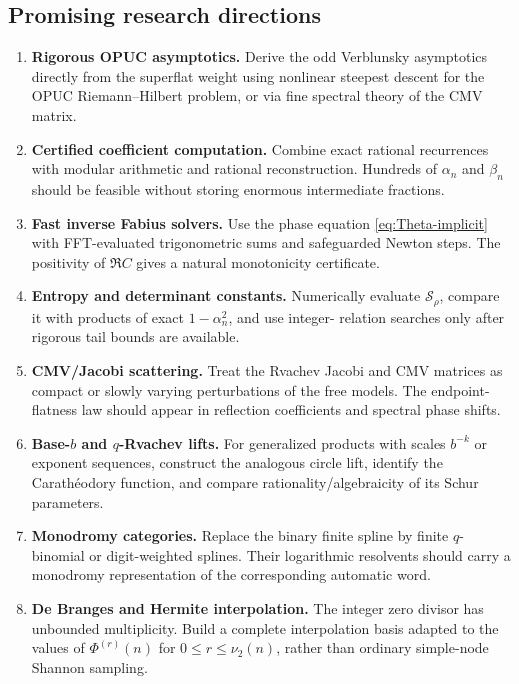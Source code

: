 \documentclass[11pt,oneside]{article}
\theoremstyle{definition}
\newcommand{\vTwo}{\nu_2}
\begin{document}
\subsection{Promising research directions}

\begin{enumerate}
\item \textbf{Rigorous OPUC asymptotics.} Derive the odd Verblunsky asymptotics directly from
the superflat weight using nonlinear steepest descent for the OPUC Riemann--Hilbert problem,
or via fine spectral theory of the CMV matrix.

\item \textbf{Certified coefficient computation.} Combine exact rational recurrences with
modular arithmetic and rational reconstruction. Hundreds of \(\alpha_n\) and \(\beta_n\)
should be feasible without storing enormous intermediate fractions.

\item \textbf{Fast inverse Fabius solvers.} Use the phase equation
\eqref{eq:Theta-implicit} with FFT-evaluated trigonometric sums and safeguarded Newton steps.
The positivity of \(\Re C\) gives a natural monotonicity certificate.

\item \textbf{Entropy and determinant constants.} Numerically evaluate
\(\mathcal S_\rho\), compare it with products of exact \(1-\alpha_n^2\), and use integer-
relation searches only after rigorous tail bounds are available.

\item \textbf{CMV/Jacobi scattering.} Treat the Rvachev Jacobi and CMV matrices as compact or
slowly varying perturbations of the free models. The endpoint-flatness law should appear in
reflection coefficients and spectral phase shifts.

\item \textbf{Base-\(b\) and \(q\)-Rvachev lifts.} For generalized products with scales
\(b^{-k}\) or exponent sequences, construct the analogous circle lift, identify the
Carath\'eodory function, and compare rationality/algebraicity of its Schur parameters.

\item \textbf{Monodromy categories.} Replace the binary finite spline by finite
\(q\)-binomial or digit-weighted splines. Their logarithmic resolvents should carry a
monodromy representation of the corresponding automatic word.

\item \textbf{De Branges and Hermite interpolation.} The integer zero divisor has unbounded
multiplicity. Build a complete interpolation basis adapted to the values of
\(\Phi^{(r)}(n)\) for \(0\le r\le\vTwo(n)\), rather than ordinary simple-node Shannon
sampling.


\end{enumerate}
\end{document}
